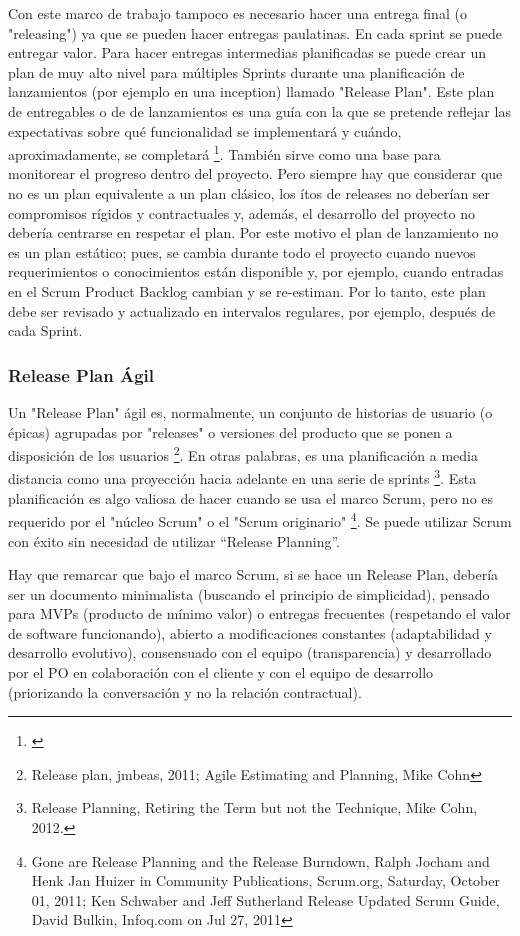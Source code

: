 Con este marco de trabajo tampoco es necesario hacer una entrega final (o "releasing") ya que se pueden hacer entregas paulatinas. En cada sprint se puede entregar valor. Para hacer entregas intermedias planificadas se puede crear un plan de muy alto nivel para múltiples Sprints durante una planificación de lanzamientos (por ejemplo en una inception) llamado "Release Plan". Este plan de entregables o de de lanzamientos es una guía con la que se pretende reflejar las expectativas sobre qué funcionalidad se implementará y cuándo, aproximadamente, se completará \footnote{\cite{Scrum-Institute-2015}}. También sirve como una base para monitorear el progreso dentro del proyecto. Pero siempre hay que considerar que no es un plan equivalente a un plan clásico, los ítos de releases no deberían ser compromisos rígidos y contractuales y, además, el desarrollo del proyecto no debería centrarse en respetar el plan. Por este motivo el plan de lanzamiento no es un plan estático; pues, se cambia durante todo el proyecto cuando nuevos requerimientos o conocimientos están disponible y, por ejemplo, cuando entradas en el Scrum Product Backlog cambian y se re-estiman. Por lo tanto, este plan debe ser revisado y actualizado en intervalos regulares, por ejemplo, después de cada Sprint.

\subsubsection{Release Plan Ágil}

Un "Release Plan" ágil es, normalmente, un conjunto de historias de usuario (o épicas) agrupadas por "releases" o versiones del producto que se ponen a disposición de los usuarios \footnote{Release plan, jmbeas, 2011; Agile Estimating and Planning, Mike Cohn}. En otras palabras, es una planificación a media distancia como una proyección hacia adelante en una serie de sprints \footnote{Release Planning, Retiring the Term but not the Technique, Mike Cohn, 2012.}. Esta planificación es algo valiosa de hacer cuando se usa el marco Scrum, pero no es requerido por el "núcleo Scrum" o el "Scrum originario" \footnote{Gone are Release Planning and the Release Burndown, Ralph Jocham and Henk Jan Huizer in Community Publications, Scrum.org, Saturday, October 01, 2011; Ken Schwaber and Jeff Sutherland Release Updated Scrum Guide, David Bulkin, Infoq.com on Jul 27, 2011}. Se puede utilizar Scrum con éxito sin necesidad de utilizar “Release Planning”.

Hay que remarcar que bajo el marco Scrum, si se hace un Release Plan, debería ser un documento minimalista (buscando el principio de simplicidad), pensado para MVPs (producto de mínimo valor) o entregas frecuentes (respetando el valor de software funcionando), abierto a modificaciones constantes (adaptabilidad y desarrollo evolutivo), consensuado con el equipo (transparencia) y desarrollado por el PO en colaboración con el cliente y con el equipo de desarrollo (priorizando la conversación y no la relación contractual).

